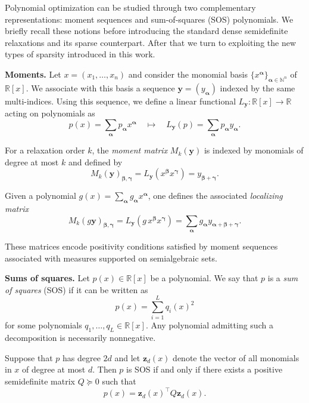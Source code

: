 \documentclass[11pt,a4paper]{article}
\theoremstyle{definition}
\begin{document}
Polynomial optimization can be studied through two complementary
representations: moment sequences and sum-of-squares (SOS) polynomials.
We briefly recall these notions before introducing the standard dense
semidefinite relaxations \cite{Lasserre2001} and its sparse counterpart. After that we turn to exploiting the new types of sparsity introduced in this work.

\noindent\textbf{Moments.}
Let $x=(x_1,\dots,x_n)$ and consider the monomial basis
$\{x^{\bm{\alpha}}\}_{\bm{\alpha}\in\mathbb{N}^n}$ of
$\mathbb{R}[x]$.  
We associate with this basis a sequence
$\mathbf{y}=(y_{\bm{\alpha}})$ indexed by the same multi-indices.
Using this sequence, we define a linear functional
$L_{\mathbf{y}}:\mathbb{R}[x]\rightarrow\mathbb{R}$ acting on
polynomials as
\begin{equation}
p(x)=\sum_{\bm{\alpha}} p_{\bm{\alpha}}x^{\bm{\alpha}}
\quad\mapsto\quad
L_{\mathbf{y}}(p)=\sum_{\bm{\alpha}} p_{\bm{\alpha}}y_{\bm{\alpha}} .
\end{equation}

For a relaxation order $k$, the \emph{moment matrix} $M_k(\mathbf{y})$
is indexed by monomials of degree at most $k$ and defined by
\begin{equation}
M_k(\mathbf{y})_{\bm{\beta},\bm{\gamma}}
=
L_{\mathbf{y}}(x^{\bm{\beta}}x^{\bm{\gamma}})
=
y_{\bm{\beta}+\bm{\gamma}} .
\end{equation}

Given a polynomial
$g(x)=\sum_{\bm{\alpha}} g_{\bm{\alpha}}x^{\bm{\alpha}}$,
one defines the associated \emph{localizing matrix}
\begin{equation}
M_k(g\mathbf{y})_{\bm{\beta},\bm{\gamma}}
=
L_{\mathbf{y}}(g\,x^{\bm{\beta}}x^{\bm{\gamma}})
=
\sum_{\bm{\alpha}} g_{\bm{\alpha}}
y_{\bm{\alpha}+\bm{\beta}+\bm{\gamma}} .
\end{equation}

These matrices encode positivity conditions satisfied by moment sequences
associated with measures supported on semialgebraic sets.

\medskip
\noindent\textbf{Sums of squares.}
Let $p(x)\in\mathbb{R}[x]$ be a polynomial.
We say that $p$ is a \emph{sum of squares} (SOS) if it can be written as
\begin{equation}
p(x)=\sum_{i=1}^L q_i(x)^2
\end{equation}
for some polynomials $q_1,\dots,q_L\in\mathbb{R}[x]$.
Any polynomial admitting such a decomposition is necessarily
nonnegative.

Suppose that $p$ has degree $2d$ and let $\mathbf{z}_d(x)$
denote the vector of all monomials in $x$ of degree at most $d$.
Then $p$ is SOS if and only if there exists a positive semidefinite
matrix $Q\succeq0$ such that
\begin{equation}
p(x)=\mathbf{z}_d(x)^{\!\top}Q\mathbf{z}_d(x).
\end{equation}
\end{document}
